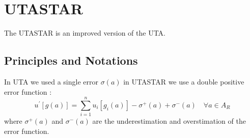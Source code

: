 \documentclass{report}
\begin{document}
\section{UTASTAR}
The UTASTAR is an improved version of the UTA. 
\subsection{Principles and Notations}
In UTA we used a single error $\sigma(a)$ in UTASTAR we use a double positive error function : 
\begin{equation}
	u^{'} [g(a)] = \sum_{i=1}^{n} u_i [g_i (a)] - \sigma ^{+} (a)+ \sigma ^{-} (a) \quad  \forall a \in A_R
\end{equation}
where $\sigma ^{+} (a)$ and $\sigma ^{-} (a)$ are the underestimation and overstimation of the error function.\\ 
\end{document}
